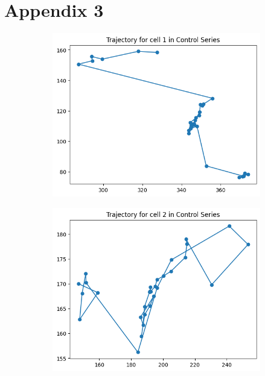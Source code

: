 \documentclass{article}
\begin{document}
\newpage
\section*{Appendix 3}

\begin{figure}[h!]
    \centering
    \begin{subfigure}[b]{0.5\linewidth}
        \centering
        \includegraphics[width=\linewidth]{Report/Appendix_Images/Trajectory-A-Control/trajectory_1.png}
        \caption{}
    \end{subfigure}%
    \begin{subfigure}[b]{0.5\linewidth}
        \centering
        \includegraphics[width=\linewidth]{Report/Appendix_Images/Trajectory-A-Control/trajectory_2.png}

\end{subfigure}
\end{figure}
\end{document}
